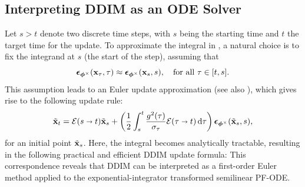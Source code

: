 \subsection{Interpreting DDIM as an ODE Solver}
Let $s > t$ denote two discrete time steps, with $s$ being the starting time and $t$ the target time for the update. To approximate the integral in , a natural choice is to fix the integrand at  $s$ (the start of the step), assuming that
\[
\bm{\epsilon}_{\bm{\phi}^\times}({\mathbf{x}}_\tau, \tau) \approx \bm{\epsilon}_{\bm{\phi}^\times}({\mathbf{x}}_s, s), \quad \text{for all } \tau \in [t, s].
\]
This assumption leads to an Euler update approximation (see also ), which gives rise to the following update rule:
\begin{equation}\label{eq:ddim-g-sigma}
    \tilde{{\mathbf{x}}}_{t} = \mathcal{E}(s \shortrightarrow t)\tilde{{\mathbf{x}}}_{s} 
    + \left( \frac{1}{2} \int_{s}^{t} \frac{g^2(\tau)}{\sigma_\tau} \mathcal{E}(\tau \shortrightarrow t) \mathop{}\!\mathrm{d}\tau \right) 
    \bm{\epsilon}_{\bm{\phi}^\times}(\tilde{{\mathbf{x}}}_{s}, s),
\end{equation}
for an initial point $\tilde{{\mathbf{x}}}_{s}$. Here, the integral becomes analytically tractable, resulting in the following practical and efficient DDIM update formula:
This correspondence reveals that DDIM can be interpreted as a first-order Euler method applied to the exponential-integrator transformed semilinear PF-ODE.

